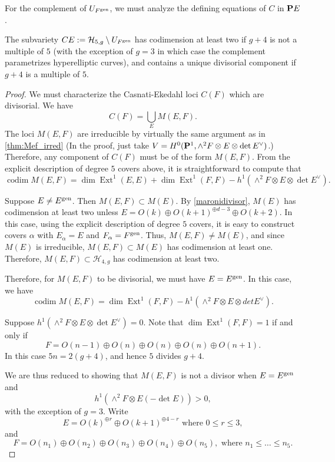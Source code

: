 \documentclass{article}
\renewcommand {\P}{{\bf P}}
\providecommand{\Ext}{\operatorname{Ext}}
\providecommand{\codim}{\operatorname{codim}}
\renewcommand{\H}{\mathcal H}
\newcommand{\gen}{{\rm gen}}
\numberwithin{equation}{section}
\begin{document}
For the complement of $U_{F^\gen}$, we must analyze the defining equations of $C$ in $\P E$.
\begin{proposition}\label{thm:5_compUf}
  The subvariety $CE := \H_{5,g} \setminus U_{F^\gen}$ has codimension
  at least two if $g+4$ is not a multiple of $5$ (with the exception
  of $g = 3$ in which case the complement parametrizes hyperelliptic
  curves), and contains a unique divisorial component if $g+4$ is a
  multiple of $5$.
 \end{proposition}
 \begin{proof}
   We must characterize the Casnati-Ekedahl loci $C(F)$ which are divisorial. We have
   \[C(F) = \bigcup_{E}M(E,F).\] The loci $M(E, F)$ are irreducible by
   virtually the same argument as in \autoref{thm:Mef_irred} (In the
   proof, just take $V = H^0(\P^1, \wedge^2 F \otimes E \otimes \det
   E^\vee)$.) Therefore, any component of $C(F)$ must be of the form
   $M(E,F)$. From the explicit description of degree $5$ covers above,
   it is straightforward to compute that
   \[\codim M(E,F) = \dim \Ext^{1}(E,E) + \dim \Ext^{1}(F,F) -
   h^{1}(\wedge^2F \otimes E \otimes \det E^\vee ).\]

   Suppose $E \neq E^\gen$. Then $M(E, F) \subset M(E)$. By
   \autoref{maronidivisor}, $M(E)$ has codimension at least two unless
   $E = O(k) \oplus O(k+1)^{\oplus d-3} \oplus O(k+2)$. In this case,
   using the explicit description of degree $5$ covers, it is easy to
   construct covers $\alpha$ with $E_\alpha = E$ and $F_\alpha =
   F^\gen$. Thus, $M(E, F) \neq M(E)$, and since $M(E)$ is
   irreducible, $M(E,F) \subset M(E)$ has codimension at least
   one. Therefore, $M(E, F) \subset \H_{4,g}$ has codimension at least
   two.

   Therefore, for $M(E, F)$ to be divisorial, we must have $E = E^\gen$. In
   this case, we have
   \[ \codim M(E,F) = \dim \Ext^1(F,F) - h^1(\wedge^2 F \otimes E \otimes det E^\vee).\]

   Suppose $h^1(\wedge^2 F \otimes E\otimes\det E^\vee) = 0$. Note that $\dim \Ext^1(F,F) = 1$ if and only if 
   \[F = O(n-1) \oplus O(n) \oplus O(n) \oplus O(n) \oplus O(n+1).\]
   In this case $5n = 2(g+4)$, and hence $5$ divides $g+4$. 

   We are thus reduced to showing that $M(E, F)$ is not a divisor when $E = E^\gen$ and  
   \[h^1(\wedge^2 F \otimes E(-\det E)) > 0,\]
   with the exception of $g = 3$. Write 
   \[E = O(k)^{\oplus r} \oplus O(k+1)^{\oplus 4-r} \text{ where } 0 \leq r \leq 3,\]
   and 
   \[F = O(n_1) \oplus O(n_2) \oplus O(n_3) \oplus O(n_4) \oplus
   O(n_5), \text{ where } n_1 \leq \dots \leq n_5.\]


\end{proof}
\end{document}

